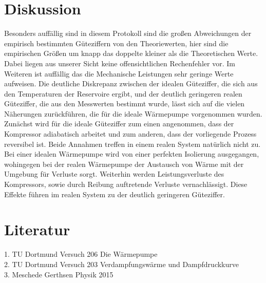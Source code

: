 \section{Diskussion}
\label{sec:Diskussion}
Besonders auffällig sind in diesem Protokoll sind die großen 
Abweichungen der empirisch bestimmten Güteziffern von den Theoriewerten,
hier sind die empirischen Größen um knapp das doppelte kleiner als die
Theoretischen Werte.  Dabei liegen aus unserer Sicht
keine offensichtlichen Rechenfehler vor. Im Weiteren ist auffällig das die Mechanische Leistungen 
sehr geringe Werte aufweisen. 
Die deutliche Diskrepanz zwischen der idealen Güteziffer, die sich aus den 
Temperaturen der Reservoire ergibt, und der deutlich geringeren realen Güteziffer, 
die aus den Messwerten bestimmt wurde, lässt sich auf die vielen Näherungen zurückführen, 
die für die ideale Wärmepumpe vorgenommen wurden. Zunächst wird für die ideale Güteziffer 
zum einen angenommen, dass der Kompressor adiabatisch arbeitet und zum anderen, dass der 
vorliegende Prozess reversibel ist. Beide Annahmen treffen in einem realen System natürlich 
nicht zu. Bei einer idealen Wärmepumpe wird von einer perfekten Isolierung ausgegangen, wohingegen 
bei der realen Wärmepumpe der Austausch von Wärme mit der Umgebung für Verluste sorgt. Weiterhin 
werden Leistungsverluste des Kompressors, sowie durch Reibung auftretende Verluste vernachlässigt. 
Diese Effekte führen im realen System zu der deutlich geringeren Güteziffer.


\section{Literatur}
1. TU Dortmund Versuch 206 Die Wärmepumpe\\
2. TU Dortmund Versuch 203 Verdampfungswärme und Dampfdruckkurve\\
3. Meschede Gerthsen Physik 2015